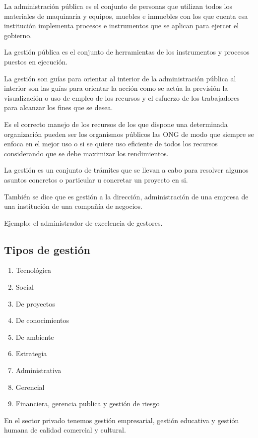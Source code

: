 \documentclass[
  a4paper,
]{article}
\providecommand{\tightlist}{%
  \setlength{\itemsep}{0pt}\setlength{\parskip}{0pt}}\usepackage{longtable,booktabs,array}
\begin{document}
La administración pública es el conjunto de personas que utilizan todos
los materiales de maquinaria y equipos, muebles e inmuebles con los que
cuenta esa institución implementa procesos e instrumentos que se aplican
para ejercer el gobierno.

La gestión pública es el conjunto de herramientas de los instrumentos y
procesos puestos en ejecución.

La gestión son guías para orientar al interior de la administración
pública al interior son las guías para orientar la acción como se actúa
la previsión la visualización o uso de empleo de los recursos y el
esfuerzo de los trabajadores para alcanzar los fines que se desea.

Es el correcto manejo de los recursos de los que dispone una determinada
organización pueden ser los organismos públicos las ONG de modo que
siempre se enfoca en el mejor uso o si se quiere uso eficiente de todos
los recursos considerando que se debe maximizar los rendimientos.

La gestión es un conjunto de trámites que se llevan a cabo para resolver
algunos asuntos concretos o particular u concretar un proyecto en si.

También se dice que es gestión a la dirección, administración de una
empresa de una institución de una compañía de negocios.

Ejemplo: el administrador de excelencia de gestores.

\subsection{Tipos de gestión}\label{tipos-de-gestiuxf3n}

\begin{enumerate}
\def\labelenumi{\arabic{enumi}.}
\tightlist
\item
  Tecnológica
\item
  Social
\item
  De proyectos
\item
  De conocimientos
\item
  De ambiente
\item
  Estrategia
\item
  Administrativa
\item
  Gerencial
\item
  Financiera, gerencia publica y gestión de riesgo
\end{enumerate}

En el sector privado tenemos gestión empresarial, gestión educativa y
gestión humana de calidad comercial y cultural.
\end{document}

